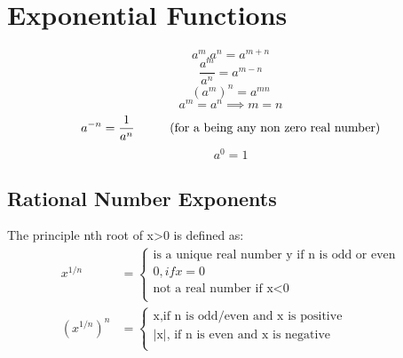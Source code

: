 \section{Exponential Functions}
\begin{equation}
\label{amn}
a^m . a^n  = a^{m+n}
\end{equation}
\begin{equation}
\label{am/n}
\frac{a^m}{a^n}  = a^{m-n}
\end{equation}
\begin{equation}
\label{a^mn}
({a^m})^{n} = a^{mn}
\end{equation}
\begin{equation}
\label{am_equal_an}
a^m = a^n \implies m = n
\end{equation}
\begin{equation}
\label{atominusn}
a^{-n} = \frac{1}{a^n} \hspace{10mm} 
\text{(for a being any non zero real number)}
\end{equation}
\begin{equation}
\label{ato0}
a^{0} = 1
\end{equation}

\subsection{Rational Number Exponents}
The principle nth root of x>0 is defined as: \\
\begin{align*}
x^{1/n} &= 
\begin{cases}
\text{is a unique real number y if n is odd or even} \\
0, if x = 0 \\
\text{not a real number if x<0}\\
\end{cases}
\\
(x^{1/n})^{n} &= 
\begin{cases}
\text{x,if n is odd/even and x is positive} \\
\text{|x|, if n is even and x is negative}\\
\end{cases}
\end{align*}




